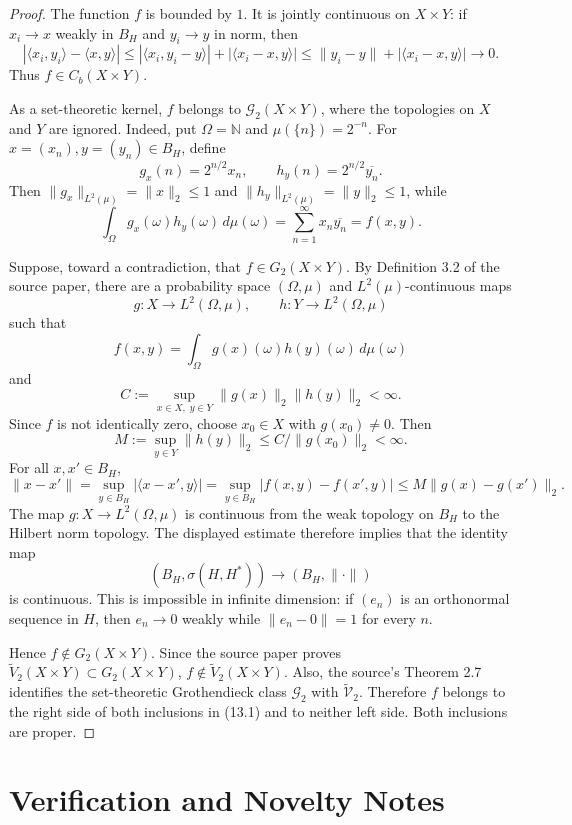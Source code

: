 \documentclass[11pt]{article}
\begin{document}
\begin{proof}
The function \(f\) is bounded by \(1\). It is jointly continuous on
\(X\times Y\): if \(x_i\to x\) weakly in \(B_H\) and \(y_i\to y\) in norm, then
\[
|\langle x_i,y_i\rangle-\langle x,y\rangle|
\leq |\langle x_i,y_i-y\rangle|+|\langle x_i-x,y\rangle|
\leq \|y_i-y\|+|\langle x_i-x,y\rangle|\to 0.
\]
Thus \(f\in C_b(X\times Y)\).

As a set-theoretic kernel, \(f\) belongs to \(\mathcal G_2(X\times Y)\), where
the topologies on \(X\) and \(Y\) are ignored. Indeed, put
\(\Omega=\mathbb N\) and \(\mu(\{n\})=2^{-n}\). For
\(x=(x_n),y=(y_n)\in B_H\), define
\[
g_x(n)=2^{n/2}x_n,\qquad h_y(n)=2^{n/2}\overline{y_n}.
\]
Then \(\|g_x\|_{L^2(\mu)}=\|x\|_2\leq 1\) and
\(\|h_y\|_{L^2(\mu)}=\|y\|_2\leq 1\), while
\[
\int_\Omega g_x(\omega)h_y(\omega)\,d\mu(\omega)
=\sum_{n=1}^\infty x_n\overline{y_n}
=f(x,y).
\]

Suppose, toward a contradiction, that \(f\in G_2(X\times Y)\). By Definition
3.2 of the source paper, there are a probability space \((\Omega,\mu)\) and
\(L^2(\mu)\)-continuous maps
\[
g:X\to L^2(\Omega,\mu),\qquad h:Y\to L^2(\Omega,\mu)
\]
such that
\[
f(x,y)=\int_\Omega g(x)(\omega)h(y)(\omega)\,d\mu(\omega)
\]
and
\[
C:=\sup_{x\in X,\;y\in Y}\|g(x)\|_2\|h(y)\|_2<\infty .
\]
Since \(f\) is not identically zero, choose \(x_0\in X\) with \(g(x_0)\ne 0\).
Then
\[
M:=\sup_{y\in Y}\|h(y)\|_2\leq C/\|g(x_0)\|_2<\infty .
\]
For all \(x,x'\in B_H\),
\[
\|x-x'\|
=\sup_{y\in B_H}|\langle x-x',y\rangle|
=\sup_{y\in B_H}|f(x,y)-f(x',y)|
\leq M\|g(x)-g(x')\|_2 .
\]
The map \(g:X\to L^2(\Omega,\mu)\) is continuous from the weak topology on
\(B_H\) to the Hilbert norm topology. The displayed estimate therefore implies
that the identity map
\[
(B_H,\sigma(H,H^*))\longrightarrow (B_H,\|\cdot\|)
\]
is continuous. This is impossible in infinite dimension: if
\((e_n)\) is an orthonormal sequence in \(H\), then \(e_n\to 0\) weakly while
\(\|e_n-0\|=1\) for every \(n\).

Hence \(f\notin G_2(X\times Y)\). Since the source paper proves
\(\widetilde V_2(X\times Y)\subset G_2(X\times Y)\), \(f\notin
\widetilde V_2(X\times Y)\). Also, the source's Theorem 2.7 identifies the
set-theoretic Grothendieck class \(\mathcal G_2\) with
\(\widetilde{\mathcal V}_2\). Therefore \(f\) belongs to the right side of both
inclusions in (13.1) and to neither left side. Both inclusions are proper.
\end{proof}

\section*{Verification and Novelty Notes}
\end{document}
